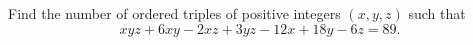 Find the number of ordered triples of positive integers $(x,y,z)$ such that
\[xyz+6xy-2xz+3yz-12x+18y-6z=89.\]
